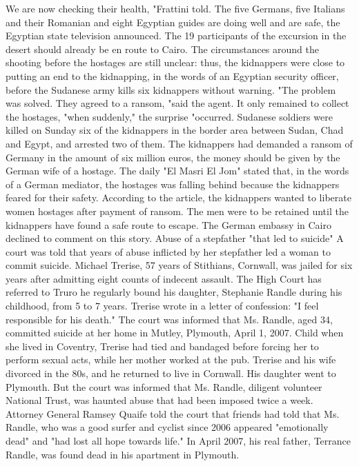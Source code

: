 We are now checking their health, "Frattini told.
The five Germans, five Italians and their Romanian and eight Egyptian guides are doing well and are safe, the Egyptian state television announced.
The 19 participants of the excursion in the desert should already be en route to Cairo.
The circumstances around the shooting before the hostages are still unclear: thus, the kidnappers were close to putting an end to the kidnapping, in the words of an Egyptian security officer, before the Sudanese army kills six kidnappers without warning.
"The problem was solved.
They agreed to a ransom, "said the agent.
It only remained to collect the hostages, "when suddenly," the surprise "occurred.
Sudanese soldiers were killed on Sunday six of the kidnappers in the border area between Sudan, Chad and Egypt, and arrested two of them.
The kidnappers had demanded a ransom of Germany in the amount of six million euros, the money should be given by the German wife of a hostage.
The daily "El Masri El Jom" stated that, in the words of a German mediator, the hostages was falling behind because the kidnappers feared for their safety.
According to the article, the kidnappers wanted to liberate women hostages after payment of ransom.
The men were to be retained until the kidnappers have found a safe route to escape.
The German embassy in Cairo declined to comment on this story.
Abuse of a stepfather "that led to suicide"
A court was told that years of abuse inflicted by her stepfather led a woman to commit suicide.
Michael Trerise, 57 years of Stithians, Cornwall, was jailed for six years after admitting eight counts of indecent assault.
The High Court has referred to Truro he regularly bound his daughter, Stephanie Randle during his childhood, from 5 to 7 years.
Trerise wrote in a letter of confession: "I feel responsible for his death."
The court was informed that Ms. Randle, aged 34, committed suicide at her home in Mutley, Plymouth, April 1, 2007.
Child when she lived in Coventry, Trerise had tied and bandaged before forcing her to perform sexual acts, while her mother worked at the pub.
Trerise and his wife divorced in the 80s, and he returned to live in Cornwall.
His daughter went to Plymouth.
But the court was informed that Ms. Randle, diligent volunteer National Trust, was haunted abuse that had been imposed twice a week.
Attorney General Ramsey Quaife told the court that friends had told that Ms. Randle, who was a good surfer and cyclist since 2006 appeared "emotionally dead" and "had lost all hope towards life."
In April 2007, his real father, Terrance Randle, was found dead in his apartment in Plymouth.
